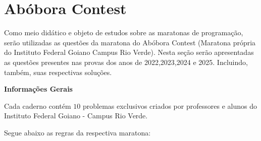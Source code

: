 \section{Abóbora Contest}
Como meio didático e objeto de estudos sobre as maratonas de programação, serão utilizadas as questões da maratona do Abóbora Contest (Maratona própria do Instituto Federal Goiano Campus Rio Verde). Nesta seção serão apresentadas as questões presentes nas provas dos anos de 2022,2023,2024 e 2025. Incluindo, também, suas respectivas soluções. 

\begin{center}
 {\large {\textbf 
{\large \textbf{Informações Gerais}}
}}
\end{center}

Cada caderno contém $10$ problemas exclusivos criados por professores e alunos do Instituto Federal Goiano - Campus Rio Verde.

Segue abaixo as regras da respectiva maratona:

